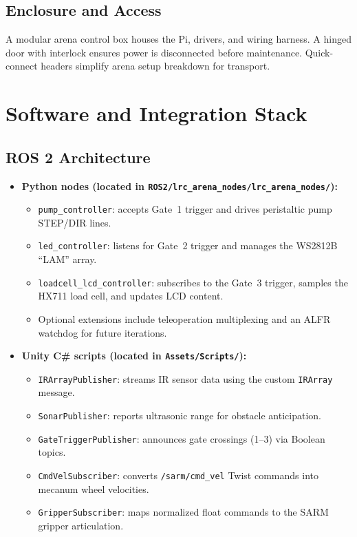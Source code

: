 \documentclass[12pt]{article}
\begin{document}
\subsection{Enclosure and Access}
A modular arena control box houses the Pi, drivers, and wiring harness. A hinged door with interlock ensures power is disconnected before maintenance. Quick-connect headers simplify arena setup breakdown for transport.

\section{Software and Integration Stack}
\subsection{ROS 2 Architecture}
\begin{itemize}
    \item \textbf{Python nodes (located in \texttt{ROS2/lrc\_arena\_nodes/lrc\_arena\_nodes/}):}
    \begin{itemize}
        \item \texttt{pump\_controller}: accepts Gate~1 trigger and drives peristaltic pump STEP/DIR lines.
        \item \texttt{led\_controller}: listens for Gate~2 trigger and manages the WS2812B ``LAM'' array.
        \item \texttt{loadcell\_lcd\_controller}: subscribes to the Gate~3 trigger, samples the HX711 load cell, and updates LCD content.
        \item Optional extensions include teleoperation multiplexing and an ALFR watchdog for future iterations.
    \end{itemize}
    \item \textbf{Unity C\# scripts (located in \texttt{Assets/Scripts/}):}
    \begin{itemize}
        \item \texttt{IRArrayPublisher}: streams IR sensor data using the custom \texttt{IRArray} message.
        \item \texttt{SonarPublisher}: reports ultrasonic range for obstacle anticipation.
        \item \texttt{GateTriggerPublisher}: announces gate crossings (1--3) via Boolean topics.
        \item \texttt{CmdVelSubscriber}: converts \texttt{/sarm/cmd\_vel} Twist commands into mecanum wheel velocities.
        \item \texttt{GripperSubscriber}: maps normalized float commands to the SARM gripper articulation.

\end{itemize}
\end{itemize}
\end{document}
